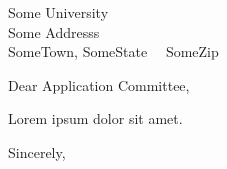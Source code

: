 \documentclass[12pt]{letter}
\date{\vspace{10mm} \today}
\makeatletter
\def\Where{\hspace{-1.2mm}\textbf{\color{BITgreen}
School of Automation,\\ Beijing Institute of Technology
}}
\def\Address{No. 5, South Street, Zhongguancun,\\ Haidian District,}
\def\CityZip{Beijing, Beijing, 100081}
\def\Email{\textbf{\color{BITgreen}E-mail}: xxx@bit.edu.cn}
\def\TEL{\textbf{\color{BITgreen}Phone}: 86-xxxx-xxxxxxxx}
\def\URL{\textbf{\color{BITgreen}URL}: http://bit.edu.cn/XXX}
\def\newaddress{
\Where\\ 
\Address\\ 
\CityZip\\ 
\TEL\\ 
\Email\\ 
\URL 
}
\makeatother
\begin{document}
\begin{letter}{
               Some University\\ 
               Some Addresss\\ 
               SomeTown, SomeState 					       				  		 ~~SomeZip
               }


\opening{Dear Application Committee,}

Lorem ipsum dolor sit amet.

\closing{Sincerely,}

\end{letter}
\end{document}
